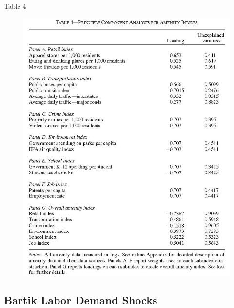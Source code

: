 \documentclass[aspectratio=169]{beamer}
\begin{document}

\begin{frame}{Table 4}

\begin{figure}
    \centering
    \includegraphics[scale=0.5]{DiamondTable4.jpg}
    \label{fig:Table4}
\end{figure}
    
\end{frame}


\subsection{Bartik Labor Demand Shocks}

\end{document}
